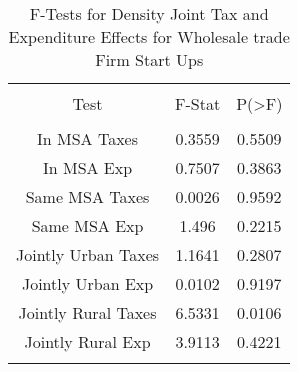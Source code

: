 
\begin{table}[!htbp] \centering 
  \caption{F-Tests for Density Joint Tax and Expenditure Effects for Wholesale trade Firm Start Ups} 
  \label{42Ftests} 
\begin{tabular}{@{\extracolsep{5pt}} ccc} 
\\[-1.8ex]\hline 
\hline \\[-1.8ex] 
Test & F-Stat & P(\textgreater F) \\ 
\hline \\[-1.8ex] 
In MSA Taxes & 0.3559 & 0.5509 \\ 
In MSA Exp & 0.7507 & 0.3863 \\ 
Same MSA Taxes & 0.0026 & 0.9592 \\ 
Same MSA Exp & 1.496 & 0.2215 \\ 
Jointly Urban Taxes & 1.1641 & 0.2807 \\ 
Jointly Urban Exp & 0.0102 & 0.9197 \\ 
Jointly Rural Taxes & 6.5331 & 0.0106 \\ 
Jointly Rural Exp & 3.9113 & 0.4221 \\ 
\hline \\[-1.8ex] 
\end{tabular} 
\end{table} 

